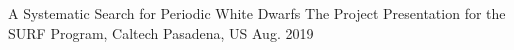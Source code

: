 


\begin{cventries}
	
	
	\cventry
	{A Systematic Search for Periodic White Dwarfs} %
	{The Project Presentation for the SURF Program, Caltech} %
	{Pasadena, US} %
	{Aug. 2019} %
	{%
	}
\end{cventries}